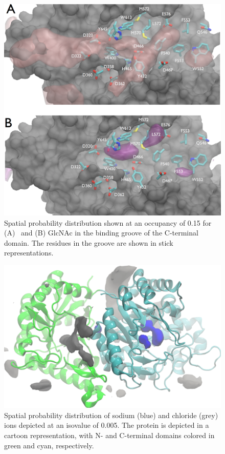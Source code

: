\begin{figure}[htbp]
\centering
\includegraphics[width=6.25in]{figures/results4/cterm_groove_surf2.pdf}
\caption[Spatial probability densities of GlcNAc and GlcNH3+ in the C-terminal groove]{Spatial probability distribution shown at an occupancy of 0.15 for (A) \glucosamine\ and (B) GlcNAc in the binding groove of the C-terminal domain.  The residues in the groove are shown in stick representations.}
\label{fig:groove}
\end{figure}

\begin{figure}[htbp]
\centering
\includegraphics[width=6.25in]{figures/results4/pgab_glucosamine_salt_densities.pdf}
\caption[Ionic distribution]{Spatial probability distribution of sodium (blue) and chloride (grey) ions depicted at an isovalue of 0.005. The protein is depicted in a cartoon representation, with N- and C-terminal domains colored in green and cyan, respectively.}
\label{fig:salt_density_distribution}
\end{figure}

